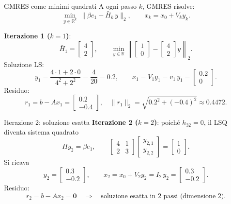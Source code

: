 \documentclass{beamer}
\begin{document}
\begin{frame}{GMRES come minimi quadrati}
A ogni passo $k$, GMRES risolve:
\[
\min_{y\in\mathbb{R}^k}\ \big\|\beta e_1-\bar H_k\,y\big\|_2,\qquad
x_k=x_0+V_k y_k.
\]

\textbf{Iterazione 1 ($k=1$)}:
\[
\bar H_1=\begin{bmatrix}4\\[2pt]2\end{bmatrix},\qquad
\min_{y\in\mathbb{R}}\left\|
\begin{bmatrix}1\\[2pt]0\end{bmatrix}-
\begin{bmatrix}4\\[2pt]2\end{bmatrix}y
\right\|_2.
\]
Soluzione LS:
\[
y_1=\frac{4\cdot 1+2\cdot 0}{4^2+2^2}=\frac{4}{20}=0.2,\qquad
x_1=V_1 y_1=v_1\,y_1=\begin{bmatrix}0.2\\[2pt]0\end{bmatrix}.
\]
Residuo:
\[
r_1=b-Ax_1=\begin{bmatrix}0.2\\[2pt]-0.4\end{bmatrix},\quad \|r_1\|_2=\sqrt{0.2^2+(-0.4)^2}\approx 0.4472.
\]
\end{frame}

\begin{frame}{Iterazione 2: soluzione esatta}
\textbf{Iterazione 2 ($k=2$)}: poiché $h_{32}=0$, il LSQ diventa sistema quadrato
\[
H y_2=\beta e_1,\qquad
\begin{bmatrix}4&1\\[2pt]2&3\end{bmatrix}
\begin{bmatrix}y_{2,1}\\[2pt]y_{2,2}\end{bmatrix}
=\begin{bmatrix}1\\[2pt]0\end{bmatrix}.
\]
Si ricava
\[
y_2=\begin{bmatrix}0.3\\[2pt]-0.2\end{bmatrix},\qquad
x_2=x_0+V_2 y_2=I_2\,y_2=\begin{bmatrix}0.3\\[2pt]-0.2\end{bmatrix}.
\]
Residuo:
\[
r_2=b-Ax_2=\bm{0}\quad\Rightarrow\quad \text{soluzione esatta in 2 passi (dimensione 2)}.
\]
\end{frame}
\end{document}
